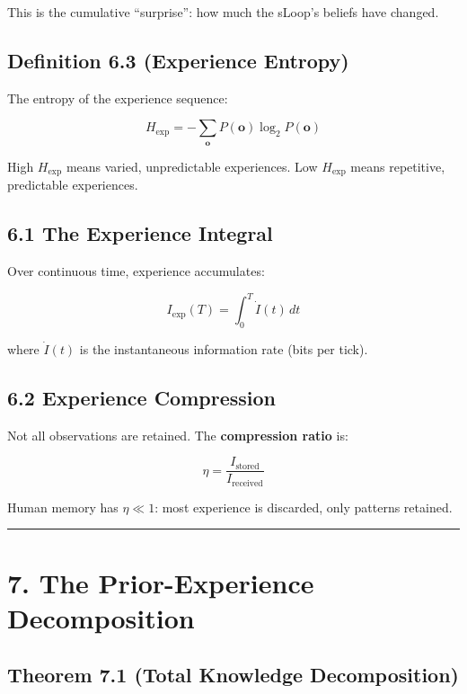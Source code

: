 \documentclass[
  11pt,
  letterpaper,
  twoside,
  openright]{book}
\begin{document}
This is the cumulative ``surprise'': how much the sLoop's beliefs have
changed.

\subsection{Definition 6.3 (Experience
Entropy)}\label{definition-6.3-experience-entropy}

The entropy of the experience sequence:

\[H_{\text{exp}} = -\sum_{\mathbf{o}} P(\mathbf{o}) \log_2 P(\mathbf{o})\]

High \(H_{\text{exp}}\) means varied, unpredictable experiences. Low
\(H_{\text{exp}}\) means repetitive, predictable experiences.

\subsection{6.1 The Experience Integral}\label{the-experience-integral}

Over continuous time, experience accumulates:

\[I_{\text{exp}}(T) = \int_0^T \dot{I}(t) \, dt\]

where \(\dot{I}(t)\) is the instantaneous information rate (bits per
tick).

\subsection{6.2 Experience Compression}\label{experience-compression}

Not all observations are retained. The \textbf{compression ratio} is:

\[\eta = \frac{I_{\text{stored}}}{I_{\text{received}}}\]

Human memory has \(\eta \ll 1\): most experience is discarded, only
patterns retained.

\begin{center}\rule{0.5\linewidth}{0.5pt}\end{center}

\section{7. The Prior-Experience
Decomposition}\label{the-prior-experience-decomposition}

\subsection{Theorem 7.1 (Total Knowledge
Decomposition)}\label{theorem-7.1-total-knowledge-decomposition}
\end{document}

